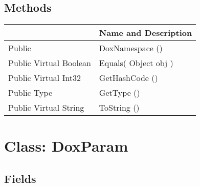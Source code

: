 \documentclass[11pt, oneside, a4paper]{book}
\begin{document}
\subsection{Methods}
\begin{center}
\begin{tabular}{| p{3cm} | p{12cm} | }
\hline
\textbf{ } & \textbf{ Name and Description}\\
\hline
 Public  &  DoxNamespace ()\hypertarget{SoftwareEngineeringTools.{}Documentation.{}DoxNamespace.{}DoxNamespace}{}\\
\hline
 Public  Virtual  Boolean &  Equals(\hypertarget{SoftwareEngineeringTools.{}Documentation.{}DoxNamespace.{}Equals\_Object}{} Object  obj  )\\
\hline
 Public  Virtual  Int32 &  GetHashCode ()\hypertarget{SoftwareEngineeringTools.{}Documentation.{}DoxNamespace.{}GetHashCode}{}\\
\hline
 Public  Type &  GetType ()\hypertarget{SoftwareEngineeringTools.{}Documentation.{}DoxNamespace.{}GetType}{}\\
\hline
 Public  Virtual  String &  ToString ()\hypertarget{SoftwareEngineeringTools.{}Documentation.{}DoxNamespace.{}ToString}{}\\
\hline
\end{tabular}
\end{center}
 


\hypertarget{SoftwareEngineeringTools.{}Documentation.{}DoxParam}{}
\section{Class: DoxParam}

\subsection{Fields}
\end{document}
